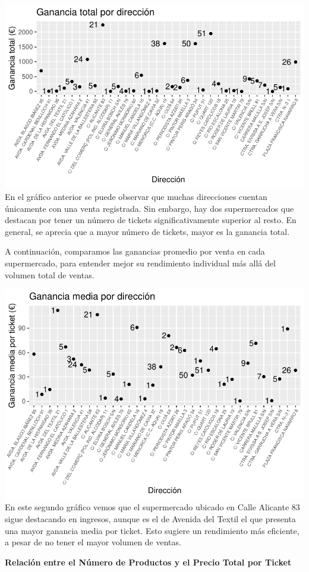 \documentclass[,article,submit,moreauthors,pdftex]{Definitions/mdpi}
\begin{document}
\includegraphics[width=0.9\linewidth]{ProyectoTD2025_files/figure-latex/grafica1-1}
En el gráfico anterior se puede observar que muchas direcciones cuentan
únicamente con una venta registrada. Sin embargo, hay dos supermercados
que destacan por tener un número de tickets significativamente superior
al resto. En general, se aprecia que a mayor número de tickets, mayor es
la ganancia total.

A continuación, comparamos las ganancias promedio por venta en cada
supermercado, para entender mejor su rendimiento individual más allá del
volumen total de ventas.

\includegraphics[width=0.9\linewidth]{ProyectoTD2025_files/figure-latex/grafica2-1}
En este segundo gráfico vemos que el supermercado ubicado en Calle
Alicante 83 sigue destacando en ingresos, aunque es el de Avenida del
Textil el que presenta una mayor ganancia media por ticket. Esto sugiere
un rendimiento más eficiente, a pesar de no tener el mayor volumen de
ventas.

\textbf{Relación entre el Número de Productos y el Precio Total por
Ticket}
\end{document}
